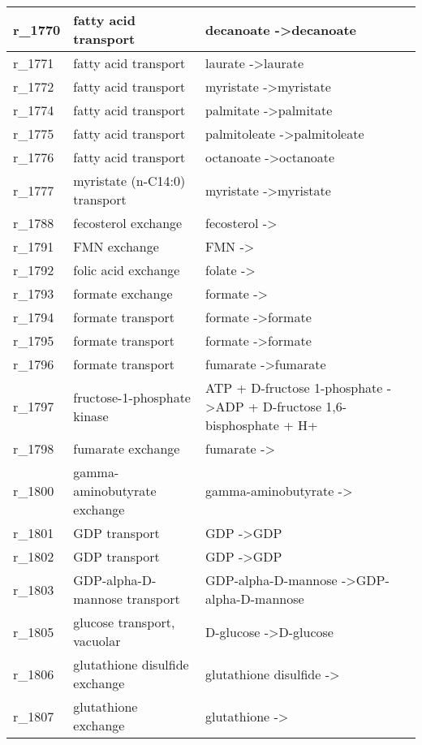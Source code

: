\begin{landscape}
{\begin{longtable}{|l|p{7cm}|p{15cm}|}
r\_1770 & fatty acid transport & decanoate  -\textgreater decanoate \\ \hline
r\_1771 & fatty acid transport & laurate  -\textgreater laurate \\ \hline
r\_1772 & fatty acid transport & myristate  -\textgreater myristate \\ \hline
r\_1774 & fatty acid transport & palmitate  -\textgreater palmitate \\ \hline
r\_1775 & fatty acid transport & palmitoleate  -\textgreater palmitoleate \\ \hline
r\_1776 & fatty acid transport & octanoate  -\textgreater octanoate \\ \hline
r\_1777 & myristate (n-C14:0) transport & myristate  -\textgreater myristate \\ \hline
r\_1788 & fecosterol exchange & fecosterol  -\textgreater{} \\ \hline
r\_1791 & FMN exchange & FMN  -\textgreater{} \\ \hline
r\_1792 & folic acid exchange & folate  -\textgreater{} \\ \hline
r\_1793 & formate exchange & formate  -\textgreater{} \\ \hline
r\_1794 & formate transport & formate  -\textgreater formate \\ \hline
r\_1795 & formate transport & formate  -\textgreater formate \\ \hline
r\_1796 & formate transport & fumarate  -\textgreater fumarate \\ \hline
r\_1797 & fructose-1-phosphate kinase & ATP + D-fructose 1-phosphate  -\textgreater ADP + D-fructose 1,6-bisphosphate + H+ \\ \hline
r\_1798 & fumarate exchange & fumarate  -\textgreater{} \\ \hline
r\_1800 & gamma-aminobutyrate exchange & gamma-aminobutyrate  -\textgreater{} \\ \hline
r\_1801 & GDP transport & GDP  -\textgreater GDP \\ \hline
r\_1802 & GDP transport & GDP  -\textgreater GDP \\ \hline
r\_1803 & GDP-alpha-D-mannose transport & GDP-alpha-D-mannose  -\textgreater GDP-alpha-D-mannose \\ \hline
r\_1805 & glucose transport, vacuolar & D-glucose  -\textgreater D-glucose \\ \hline
r\_1806 & glutathione disulfide exchange & glutathione disulfide  -\textgreater{} \\ \hline
r\_1807 & glutathione exchange & glutathione  -\textgreater{} \\ \hline

\end{longtable}}
\end{landscape}
